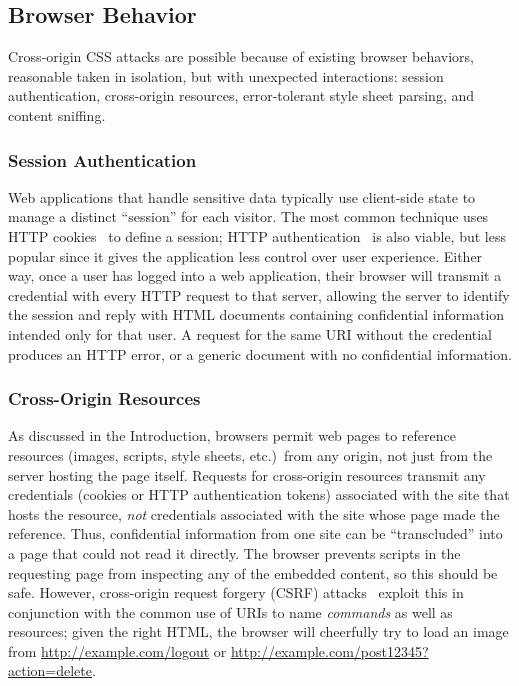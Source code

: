 \documentclass{acm_proc_article-sp}
\begin{document}
\subsection{Browser Behavior}

Cross-origin CSS attacks are possible because of existing browser
behaviors, reasonable taken in isolation, but with unexpected
interactions: session authentication, cross-origin resources,
error-tolerant style sheet parsing, and content sniffing.

\subsubsection{Session Authentication}
Web applications that handle sensitive data typically use client-side
state to manage a distinct “session” for each visitor.  The most
common technique uses HTTP cookies~\cite{rfc2109,httpstate} to define
a session; HTTP authentication~\cite{rfc2617} is also viable, but less
popular since it gives the application less control over user
experience.  Either way, once a user has logged into a web
application, their browser will transmit a credential with every HTTP
request to that server, allowing the server to identify the session
and reply with HTML documents containing confidential information
intended only for that user.  A request for the same URI without the
credential produces an HTTP error, or a generic document with no
confidential information.

\subsubsection{Cross-Origin Resources}
As discussed in the Introduction, browsers permit web pages to
reference resources (images, scripts, style sheets, etc.)\ from any
origin, not just from the server hosting the page itself.  Requests
for cross-origin resources transmit any credentials (cookies or HTTP
authentication tokens) associated with the site that hosts the
resource, \emph{not} credentials associated with the site whose page
made the reference.  Thus, confidential information from one site can
be “transcluded” into a page that could not read it directly.  The
browser prevents scripts in the requesting page from inspecting any of
the embedded content, so this should be safe.  However, cross-origin
request forgery (CSRF) attacks~\cite{csrf} exploit this in conjunction
with the common use of URIs to name \emph{commands} as well as
resources; given the right HTML, the browser will cheerfully try to
load an image from \url{http://example.com/logout} or
\url{http://example.com/post12345?action=delete}.
\end{document}
